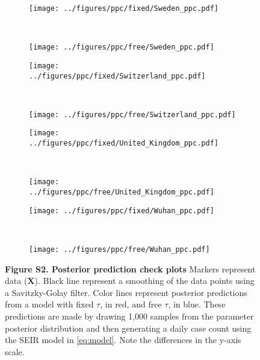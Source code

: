 \documentclass[12pt]{extarticle}
\let\vec\mathbf
\begin{document}
\begin{figure}
    \ContinuedFloat 
    \begin{subfigure}{0.45\textwidth}
        \texttt{[image: ../figures/ppc/fixed/Sweden\_ppc.pdf]}
    \end{subfigure}
    ~
    \begin{subfigure}{0.45\textwidth}
        \texttt{[image: ../figures/ppc/free/Sweden\_ppc.pdf]}
    \end{subfigure}
    \begin{subfigure}{0.45\textwidth}
        \texttt{[image: ../figures/ppc/fixed/Switzerland\_ppc.pdf]}
    \end{subfigure}
    ~
    \begin{subfigure}{0.45\textwidth}
        \texttt{[image: ../figures/ppc/free/Switzerland\_ppc.pdf]}
    \end{subfigure}
    \begin{subfigure}{0.45\textwidth}
        \texttt{[image: ../figures/ppc/fixed/United\_Kingdom\_ppc.pdf]}
    \end{subfigure}
    ~
    \begin{subfigure}{0.45\textwidth}
        \texttt{[image: ../figures/ppc/free/United\_Kingdom\_ppc.pdf]}
    \end{subfigure}
    \begin{subfigure}{0.45\textwidth}
        \texttt{[image: ../figures/ppc/fixed/Wuhan\_ppc.pdf]}
    \end{subfigure}
    ~
    \begin{subfigure}{0.45\textwidth}
        \texttt{[image: ../figures/ppc/free/Wuhan\_ppc.pdf]}
    \end{subfigure}
    \caption{
    \textbf{Figure S2. Posterior prediction check plots}
    Markers represent data ($\vec{X}$). Black line represent a smoothing of the data points using a Savitzky-Golay filter. Color lines represent posterior predictions from a model with fixed $\tau$, in red, and free $\tau$, in blue. These predictions are made by drawing 1,000 samples from the parameter posterior distribution and then generating a daily case count using the SEIR model in \autoref{eq:model}. Note the differences in the y-axis scale.
    }	
\end{figure}
\end{document}
